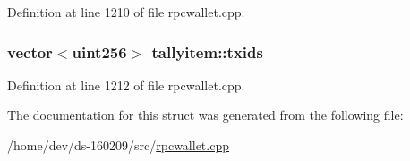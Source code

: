 Definition at line 1210 of file rpcwallet.\+cpp.

\hypertarget{structtallyitem_aa98973cace2783207b4d8bca7cc45a51}{}
\subsubsection[{txids}]{\setlength{\rightskip}{0pt plus 5cm}vector$<${\bf uint256}$>$ tallyitem\+::txids}\label{structtallyitem_aa98973cace2783207b4d8bca7cc45a51}


Definition at line 1212 of file rpcwallet.\+cpp.



The documentation for this struct was generated from the following file\+:\begin{DoxyCompactItemize}
\item 
/home/dev/ds-\/160209/src/\hyperlink{rpcwallet_8cpp}{rpcwallet.\+cpp}\end{DoxyCompactItemize}
